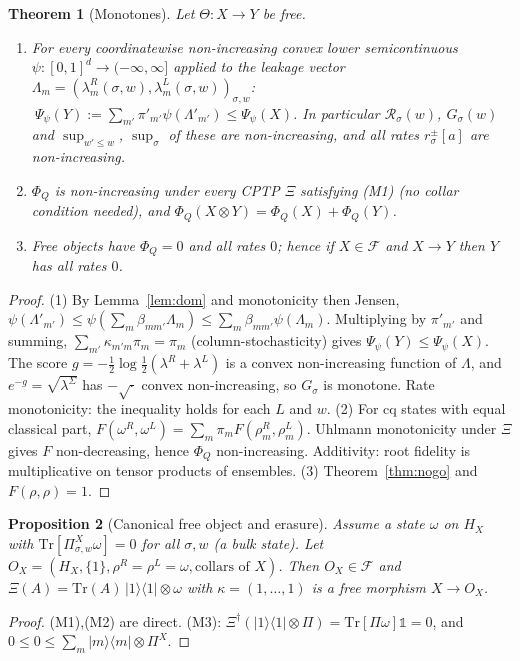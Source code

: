 \documentclass[11pt]{article}
\newtheorem{theorem}{Theorem}
\newtheorem{proposition}[theorem]{Proposition}
\theoremstyle{definition}
\theoremstyle{remark}
\newcommand{\Tr}{\mathrm{Tr}}
\newcommand{\one}{\mathbb{1}}
\begin{document}
\begin{theorem}[Monotones]\label{thm:mono}
Let $\Theta:X\to Y$ be free.
\begin{enumerate}
\item For every coordinatewise non-increasing convex lower semicontinuous $\psi:[0,1]^d\to(-\infty,\infty]$ applied to the leakage vector $\Lambda_m=(\lambda^R_m(\sigma,w),\lambda^L_m(\sigma,w))_{\sigma,w}$: $\ \Psi_\psi(Y):=\sum_{m'}\pi'_{m'}\psi(\Lambda'_{m'})\le\Psi_\psi(X)$. In particular $\mathcal R_\sigma(w)$, $G_\sigma(w)$ and $\sup_{w'\le w}$, $\sup_\sigma$ of these are non-increasing, and all rates $r^\pm_\sigma[a]$ are non-increasing.
\item $\Phi_Q$ is non-increasing under \emph{every} CPTP $\Xi$ satisfying (M1) (no collar condition needed), and $\Phi_Q(X\otimes Y)=\Phi_Q(X)+\Phi_Q(Y)$.
\item Free objects have $\Phi_Q=0$ and all rates $0$; hence if $X\in\mathcal F$ and $X\to Y$ then $Y$ has all rates $0$.
\end{enumerate}
\end{theorem}
\begin{proof}
(1) By Lemma~\ref{lem:dom} and monotonicity then Jensen, $\psi(\Lambda'_{m'})\le\psi(\sum_m\beta_{mm'}\Lambda_m)\le\sum_m\beta_{mm'}\psi(\Lambda_m)$. Multiplying by $\pi'_{m'}$ and summing, $\sum_{m'}\kappa_{m'm}\pi_m=\pi_m$ (column-stochasticity) gives $\Psi_\psi(Y)\le\Psi_\psi(X)$. The score $g=-\tfrac12\log\frac12(\lambda^R+\lambda^L)$ is a convex non-increasing function of $\Lambda$, and $e^{-g}=\sqrt{\lambda^\Sigma}$ has $-\sqrt{\cdot}$ convex non-increasing, so $G_\sigma$ is monotone. Rate monotonicity: the inequality holds for each $L$ and $w$.
(2) For cq states with equal classical part, $F(\omega^R,\omega^L)=\sum_m\pi_mF(\rho^R_m,\rho^L_m)$. Uhlmann monotonicity under $\Xi$ gives $F$ non-decreasing, hence $\Phi_Q$ non-increasing. Additivity: root fidelity is multiplicative on tensor products of ensembles.
(3) Theorem~\ref{thm:nogo} and $F(\rho,\rho)=1$.
\end{proof}

\begin{proposition}[Canonical free object and erasure]\label{prop:erase}
Assume a state $\omega$ on $H_X$ with $\Tr[\Pi^X_{\sigma,w}\omega]=0$ for all $\sigma,w$ (a bulk state). Let $O_X=(H_X,\{1\},\rho^R=\rho^L=\omega,\text{collars of }X)$. Then $O_X\in\mathcal F$ and $\Xi(A)=\Tr(A)\,|1\rangle\!\langle1|\otimes\omega$ with $\kappa=(1,\dots,1)$ is a free morphism $X\to O_X$.
\end{proposition}
\begin{proof}
(M1),(M2) are direct. (M3): $\Xi^\dagger(|1\rangle\!\langle1|\otimes\Pi)=\Tr[\Pi\omega]\one=0$, and $0\le0\le\sum_m|m\rangle\!\langle m|\otimes\Pi^X$.
\end{proof}
\end{document}
